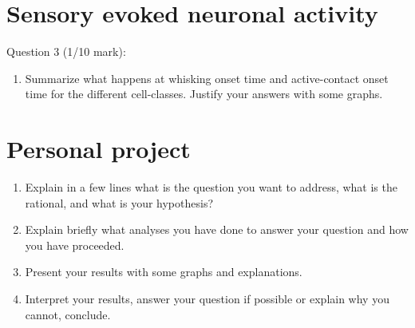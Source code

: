\documentclass{IEEEtran}
\begin{document}
\section{Sensory evoked neuronal activity}

Question 3 (1/10 mark):

\begin{enumerate}
  \item Summarize what happens at whisking onset time and active-contact onset time for the different cell-classes. Justify your answers with some graphs.
\end{enumerate}

\section{Personal project}

\begin{enumerate}
  \item Explain in a few lines what is the question you want to address, what is the rational, and what is your hypothesis?
  \item Explain briefly what analyses you have done to answer your question and how you have proceeded.
  \item Present your results with some graphs and explanations.
  \item Interpret your results, answer your question if possible or explain why you cannot, conclude.
\end{enumerate}
\end{document}
